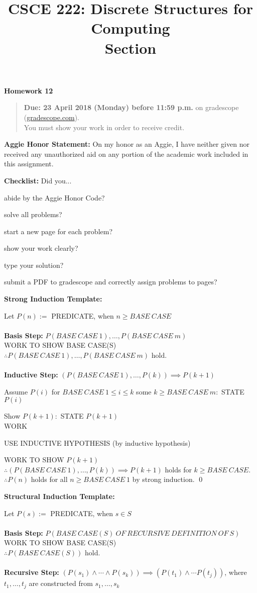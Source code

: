 \documentclass{article}
\title{CSCE 222: Discrete Structures for Computing\\Section \mysectionnumber\\\mysemester}
\author{\myname}
\date{}
\theoremstyle{definition}
\newcommand{\honor}{\noindent \textbf{Aggie Honor Statement: }On my honor as an Aggie, I have neither
  given nor received any unauthorized aid on any portion of the academic work included in this assignment.
}
\newcommand{\checklist}{\noindent\textbf{Checklist:}
Did you...
\begin{compactenum}
\item abide by the Aggie Honor Code?
\item solve all problems?
\item start a new page for each problem?
\item show your work clearly?
\item type your solution?
\item submit a PDF to gradescope and correctly assign problems to pages?
\end{compactenum}
}
\newcommand{\problemset}[1]{\begin{center}\textbf{Homework #1}\end{center}}
\newcommand{\duedate}[1]{\begin{quote}\textbf{Due: #1} on gradescope (\url{gradescope.com}). \\You must show your work in order to receive credit.\end{quote}}
\newcommand{\homeworknumber}[0]{12}
\begin{document}
\maketitle
\problemset{\homeworknumber}
\duedate{23 April 2018 (Monday) before 11:59 p.m.}
\bigskip

\honor
\bigskip

\checklist
\bigskip

\newpage

\noindent
\textbf{Strong Induction Template:}

\noindent
Let $P(n):=$ PREDICATE, when $n\geq BASE\ CASE$\\
\\
\textbf{Basis Step:} $P(BASE\ CASE\ 1), \ldots, P(BASE\ CASE\ m)$ \\

WORK TO SHOW BASE CASE(S)\\

$\therefore P(BASE\ CASE\ 1), \ldots, P(BASE\ CASE\ m)$ hold.\\
\\
\textbf{Inductive Step:} $(P(BASE\ CASE\ 1), \ldots, P(k))\implies P(k+1)$

Assume $P(i)$ for $BASE\ CASE\ 1 \leq i \leq k$ some $k\geq BASE\ CASE\ m:$ STATE $P(i)$

Show $P(k+1):$ STATE $P(k+1)$\\

WORK

USE INDUCTIVE HYPOTHESIS \hfill (by inductive hypothesis)

WORK TO SHOW $P(k+1)$\\

$\therefore  (P(BASE\ CASE\ 1), \ldots, P(k))\implies P(k+1)$ holds for $k \geq BASE\ CASE$.\\

\noindent
$\therefore P(n)$ holds for all $n \geq BASE\ CASE\ 1$ by strong induction. \qed

\vfill

\noindent
\textbf{Structural Induction Template:}

\noindent
Let $P(s):=$ PREDICATE, when $s \in S$\\
\\
\textbf{Basis Step:} $P(BASE\ CASE(S)\ OF\ RECURSIVE\ DEFINITION\ OF\ S)$ \\

WORK TO SHOW BASE CASE(S)\\

$\therefore  P(BASE\ CASE(S))$ hold.\\
\\
\textbf{Recursive Step:} $(P(s_1) \wedge \cdots \wedge P(s_k))\implies (P(t_1) \wedge \cdots P(t_j))$, where $t_1,\ldots,t_j$ are constructed from $s_1,\ldots,s_k$
\end{document}
